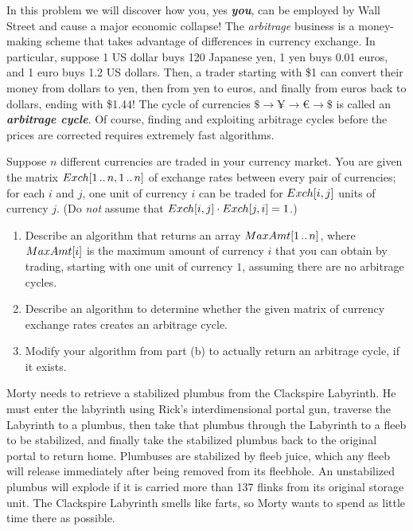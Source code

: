 \begin{exercises}
\item In this problem we will discover how you, yes \textbf{\textit{you}}, can be employed by Wall Street and cause a major economic collapse!
The \textit{arbitrage} business is a money-making scheme that takes advantage of differences in currency exchange.
In particular, suppose 1 US dollar buys 120 Japanese yen, 1 yen buys 0.01 euros, and 1 euro buys 1.2 US dollars.
Then, a trader starting with \$1 can convert their money from dollars to yen, then from yen to euros, and finally from euros back to dollars, ending with \$1.44!
The cycle of currencies $\$ \to ¥ \to € \to \$$ is called an \textbf{\textit{arbitrage cycle}}.
Of course, finding and exploiting arbitrage cycles before the prices are corrected requires extremely fast algorithms.

Suppose $n$ different currencies are traded in your currency market.
You are given the matrix $Exch[1\,..\,n, 1\,..\,n]$ of exchange rates between every pair of currencies; for each $i$ and $j$, one unit of currency $i$ can be traded for $Exch[i, j]$ units of currency $j$. (Do \textit{not} assume that $Exch[i, j] \cdot Exch[j, i] = 1$.)
\begin{enumerate}
\item Describe an algorithm that returns an array $MaxAmt[1\,..\,n]$, where $MaxAmt[i]$ is the maximum amount of currency $i$ that you can obtain by trading, starting with one unit of currency $1$, assuming there are no arbitrage cycles.
\item Describe an algorithm to determine whether the given matrix of currency exchange rates creates an arbitrage cycle.
\item Modify your algorithm from part (b) to actually return an arbitrage cycle, if it exists.
\end{enumerate}

\item Morty needs to retrieve a stabilized plumbus from the Clackspire Labyrinth.
He must enter the labyrinth using Rick’s interdimensional portal gun, traverse the Labyrinth to a plumbus, then take that plumbus through the Labyrinth to a fleeb to be stabilized, and finally take the stabilized plumbus back to the original portal to return home.
Plumbuses are stabilized by fleeb juice, which any fleeb will release immediately after being removed from its fleebhole.
An unstabilized plumbus will explode if it is carried more than 137 flinks from its original storage unit.
The Clackspire Labyrinth smells like farts, so Morty wants to spend as little time there as possible.


\end{exercises}
